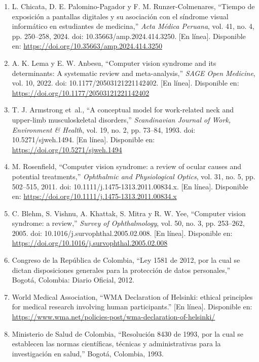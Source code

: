 \begin{enumerate}[leftmargin=1.8em,label=\lbrack\arabic*\rbrack,itemsep=0.6em]
\item L. Chicata, D. E. Palomino-Pagador y F. M. Runzer-Colmenares, ``Tiempo de exposición a pantallas digitales y su asociación con el síndrome visual informático en estudiantes de medicina,'' \emph{Acta Médica Peruana}, vol. 41, no. 4, pp. 250--258, 2024. doi: 10.35663/amp.2024.414.3250. [En línea]. Disponible en: \url{https://doi.org/10.35663/amp.2024.414.3250}

\item A. K. Lema y E. W. Anbesu, ``Computer vision syndrome and its determinants: A systematic review and meta-analysis,'' \emph{SAGE Open Medicine}, vol. 10, 2022. doi: 10.1177/20503121221142402. [En línea]. Disponible en: \url{https://doi.org/10.1177/20503121221142402}

\item T. J. Armstrong et~al., ``A conceptual model for work-related neck and upper-limb musculoskeletal disorders,'' \emph{Scandinavian Journal of Work, Environment \& Health}, vol. 19, no. 2, pp. 73--84, 1993. doi: 10.5271/sjweh.1494. [En línea]. Disponible en: \url{https://doi.org/10.5271/sjweh.1494}

\item M. Rosenfield, ``Computer vision syndrome: a review of ocular causes and potential treatments,'' \emph{Ophthalmic and Physiological Optics}, vol. 31, no. 5, pp. 502--515, 2011. doi: 10.1111/j.1475-1313.2011.00834.x. [En línea]. Disponible en: \url{https://doi.org/10.1111/j.1475-1313.2011.00834.x}

\item C. Blehm, S. Vishnu, A. Khattak, S. Mitra y R. W. Yee, ``Computer vision syndrome: a review,'' \emph{Survey of Ophthalmology}, vol. 50, no. 3, pp. 253--262, 2005. doi: 10.1016/j.survophthal.2005.02.008. [En línea]. Disponible en: \url{https://doi.org/10.1016/j.survophthal.2005.02.008}

\item Congreso de la República de Colombia, ``Ley 1581 de 2012, por la cual se dictan disposiciones generales para la protección de datos personales,'' Bogotá, Colombia: Diario Oficial, 2012.

\item World Medical Association, ``WMA Declaration of Helsinki: ethical principles for medical research involving human participants.'' [En línea]. Disponible en: \url{https://www.wma.net/policies-post/wma-declaration-of-helsinki/}

\item Ministerio de Salud de Colombia, ``Resolución 8430 de 1993, por la cual se establecen las normas científicas, técnicas y administrativas para la investigación en salud,'' Bogotá, Colombia, 1993.


\end{enumerate}
